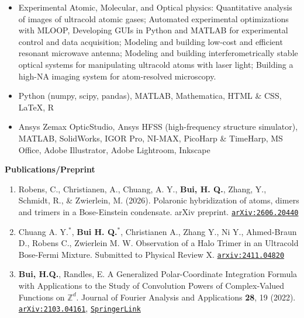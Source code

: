 \documentclass[10pt]{article}
\begin{document}
\begin{itemize}
\setlength\itemsep{-4pt}
\item Experimental Atomic, Molecular, and Optical physics: Quantitative analysis of images of ultracold atomic gases; Automated experimental optimizations with MLOOP, Developing GUIs in Python and MATLAB for experimental control and data acquisition; Modeling and building low-cost and efficient resonant microwave antenna; Modeling and building interferometrically stable optical systems for manipulating ultracold atoms with laser light; Building a high-NA imaging system for atom-resolved microscopy.
\item {} Python (numpy, scipy, pandas), MATLAB, Mathematica, HTML \& CSS, \LaTeX{}, R
\item {} Ansys Zemax OpticStudio, Ansys HFSS (high-frequency structure simulator), MATLAB, SolidWorks, IGOR Pro, NI-MAX, PicoHarp \& TimeHarp, MS Office,  Adobe Illustrator, Adobe Lightroom, Inkscape
\end{itemize}


\noindent \large{\textbf{{Publications/Preprint}}}	\normalsize 

\begin{enumerate}
	\setlength\itemsep{-4pt}
	\item Robens, C., Christianen, A., Chuang, A. Y., \textbf{Bui, H. Q.}, Zhang, Y., Schmidt, R., \& Zwierlein, M. (2026). Polaronic hybridization of atoms, dimers and trimers in a Bose-Einstein condensate. arXiv preprint. \href{https://arxiv.org/abs/2606.20440}{\texttt{arXiv:2606.20440}}
 	\item Chuang A. Y.$^*$, \textbf{Bui H. Q.}$^\mathbf{*}$, Christianen A., Zhang Y., Ni Y., Ahmed-Braun D., Robens C., Zwierlein M. W. {Observation of a Halo Trimer in an Ultracold Bose-Fermi Mixture}. Submitted to Physical Review X.  \href{https://arxiv.org/abs/2411.04820}{\texttt{arxiv:2411.04820}}
	\item \textbf{Bui, H.Q.}, Randles, E. {A Generalized Polar-Coordinate Integration Formula with Applications to the Study of Convolution Powers of Complex-Valued Functions on $\mathbb{Z}^d$}. Journal of  Fourier Analysis and Applications \textbf{28}, 19 (2022). \href{https://arxiv.org/abs/2103.04161}{\texttt{arXiv:2103.04161}}, \href{https://doi.org/10.1007/s00041-022-09905-x}{\texttt{SpringerLink}}
	
\end{enumerate}
\end{document}
